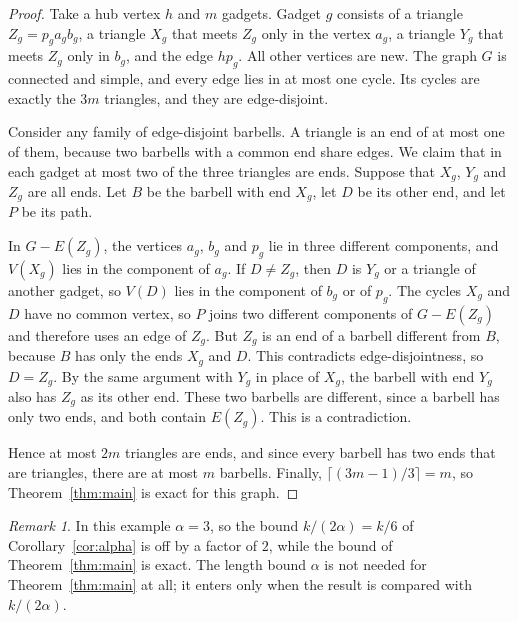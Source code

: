 \documentclass[11pt,a4paper]{article}
\theoremstyle{definition}
\theoremstyle{remark}
\newtheorem{remark}[theorem]{Remark}
\begin{document}
\begin{proof}
Take a hub vertex \(h\) and \(m\) gadgets. Gadget \(g\) consists of a triangle
\(Z_g=p_ga_gb_g\), a triangle \(X_g\) that meets \(Z_g\) only in the vertex
\(a_g\), a triangle \(Y_g\) that meets \(Z_g\) only in \(b_g\), and the edge
\(hp_g\). All other vertices are new. The graph \(G\) is connected and simple,
and every edge lies in at most one cycle. Its cycles are exactly the \(3m\)
triangles, and they are edge-disjoint.

Consider any family of edge-disjoint barbells. A triangle is an end of at most
one of them, because two barbells with a common end share edges. We claim that
in each gadget at most two of the three triangles are ends. Suppose that
\(X_g\), \(Y_g\) and \(Z_g\) are all ends. Let \(B\) be the barbell with end
\(X_g\), let \(D\) be its other end, and let \(P\) be its path.

In \(G-E(Z_g)\), the vertices \(a_g\), \(b_g\) and \(p_g\) lie in three
different components, and \(V(X_g)\) lies in the component of \(a_g\). If
\(D\ne Z_g\), then \(D\) is \(Y_g\) or a triangle of another gadget, so
\(V(D)\) lies in the component of \(b_g\) or of \(p_g\). The cycles \(X_g\) and
\(D\) have no common vertex, so \(P\) joins two different components of
\(G-E(Z_g)\) and therefore uses an edge of \(Z_g\). But \(Z_g\) is an end of a
barbell different from \(B\), because \(B\) has only the ends \(X_g\) and
\(D\). This contradicts edge-disjointness, so \(D=Z_g\). By the same argument
with \(Y_g\) in place of \(X_g\), the barbell with end \(Y_g\) also has
\(Z_g\) as its other end. These two barbells are different, since a barbell has
only two ends, and both contain \(E(Z_g)\). This is a contradiction.

Hence at most \(2m\) triangles are ends, and since every barbell has two ends
that are triangles, there are at most \(m\) barbells. Finally,
\(\lceil(3m-1)/3\rceil=m\), so Theorem~\ref{thm:main} is exact for this graph.
\end{proof}

\begin{remark}
In this example \(\alpha=3\), so the bound \(k/(2\alpha)=k/6\) of
Corollary~\ref{cor:alpha} is off by a factor of \(2\), while the bound of
Theorem~\ref{thm:main} is exact. The length bound \(\alpha\) is not needed for
Theorem~\ref{thm:main} at all; it enters only when the result is compared with
\(k/(2\alpha)\).
\end{remark}
\end{document}
